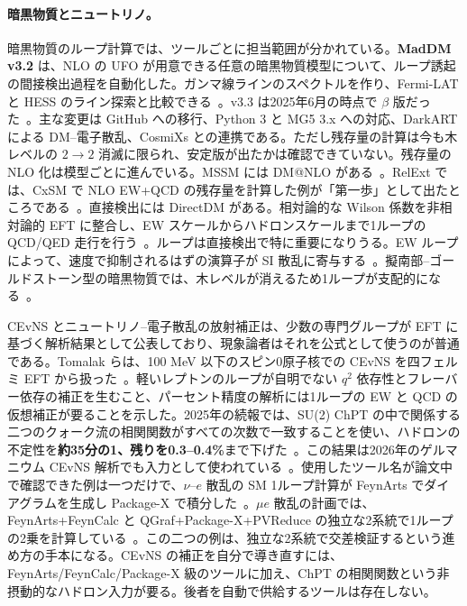 \documentclass[a4paper,10pt]{ltjsarticle}
\begin{document}
\paragraph{暗黒物質とニュートリノ。}暗黒物質のループ計算では、ツールごとに担当範囲が分かれている。\textbf{MadDM v3.2} は、NLO の UFO が用意できる任意の暗黒物質模型について、ループ誘起の間接検出過程を自動化した。ガンマ線ラインのスペクトルを作り、Fermi-LAT と HESS のライン探索と比較できる~\cite{r138}。v3.3 は2025年6月の時点で $\beta$ 版だった~\cite{r139}。主な変更は GitHub への移行、Python 3 と MG5 3.x への対応、DarkART による DM--電子散乱、CosmiXs との連携である。ただし残存量の計算は今も木レベルの $2\to 2$ 消滅に限られ、安定版が出たかは確認できていない。残存量の NLO 化は模型ごとに進んでいる。MSSM には DM@NLO がある~\cite{r140}。RelExt では、CxSM で NLO EW+QCD の残存量を計算した例が「第一歩」として出たところである~\cite{r141}。直接検出には DirectDM がある。相対論的な Wilson 係数を非相対論的 EFT に整合し、EW スケールからハドロンスケールまで1ループの QCD/QED 走行を行う~\cite{r142}。ループは直接検出で特に重要になりうる。EW ループによって、速度で抑制されるはずの演算子が SI 散乱に寄与する~\cite{r143}。擬南部--ゴールドストーン型の暗黒物質では、木レベルが消えるため1ループが支配的になる~\cite{r144}。

CEvNS とニュートリノ--電子散乱の放射補正は、少数の専門グループが EFT に基づく解析結果として公表しており、現象論者はそれを公式として使うのが普通である。Tomalak らは、100 MeV 以下のスピン0原子核での CEvNS を四フェルミ EFT から扱った~\cite{r145}。軽いレプトンのループが自明でない $q^2$ 依存性とフレーバー依存の補正を生むこと、パーセント精度の解析には1ループの EW と QCD の仮想補正が要ることを示した。2025年の続報では、SU(2) ChPT の中で関係する二つのクォーク流の相関関数がすべての次数で一致することを使い、ハドロンの不定性を\textbf{約35分の1、残りを0.3--0.4\%}まで下げた~\cite{r146,r147}。この結果は2026年のゲルマニウム CEvNS 解析でも入力として使われている~\cite{r148}。使用したツール名が論文中で確認できた例は一つだけで、$\nu$--$e$ 散乱の SM 1ループ計算が FeynArts でダイアグラムを生成し Package-X で積分した~\cite{r149}。$\mu e$ 散乱の計画では、FeynArts+FeynCalc と QGraf+Package-X+PVReduce の独立な2系統で1ループの2乗を計算している~\cite{r150}。この二つの例は、独立な2系統で交差検証するという進め方の手本になる。CEvNS の補正を自分で導き直すには、FeynArts/FeynCalc/Package-X 級のツールに加え、ChPT の相関関数という非摂動的なハドロン入力が要る。後者を自動で供給するツールは存在しない。
\end{document}
